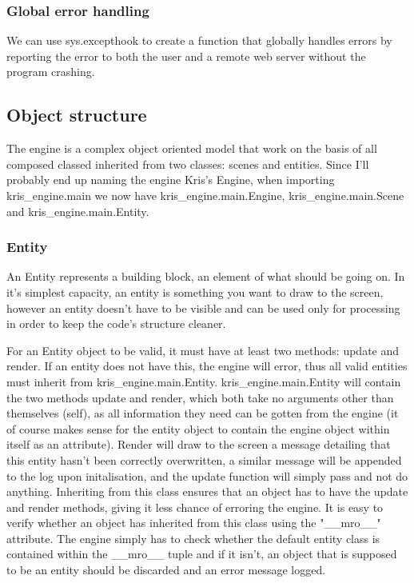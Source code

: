 \documentclass{report}
\begin{document}
\subsubsection{Global error handling}

We can use sys.excepthook to create a function that globally handles errors by reporting the error to both the user and a remote web server without the program crashing.

\subsection{Object structure}

The engine is a complex object oriented model that work on the basis of all composed classed inherited from two classes: scenes and entities. Since I'll probably end up naming the engine Kris's Engine, when importing kris\_engine.main we now have kris\_engine.main.Engine, kris\_engine.main.Scene and kris\_engine.main.Entity.

\subsubsection{Entity}

An Entity represents a building block, an element of what should be going on. In it's simplest capacity, an entity is something you want to draw to the screen, however an entity doesn't have to be visible and can be used only for processing in order to keep the code's structure cleaner.

For an Entity object to be valid, it must have at least two methods: update and render. If an entity does not have this, the engine will error, thus all valid entities must inherit from kris\_engine.main.Entity. kris\_engine.main.Entity will contain the two methods update and render, which both take no arguments other than themselves (self), as all information they need can be gotten from the engine (it of course makes sense for the entity object to contain the engine object within itself as an attribute). Render will draw to the screen a message detailing that this entity hasn't been correctly overwritten, a similar message will be appended to the log upon initalisation, and the update function will simply pass and not do anything. Inheriting from this class ensures that an object has to have the update and render methods, giving it less chance of erroring the engine. It is easy to verify whether an object has inherited from this class using the "\_\_mro\_\_" attribute. The engine simply has to check whether the default entity class is contained within the \_\_mro\_\_ tuple and if it isn't, an object that is supposed to be an entity should be discarded and an error message logged.
\end{document}
